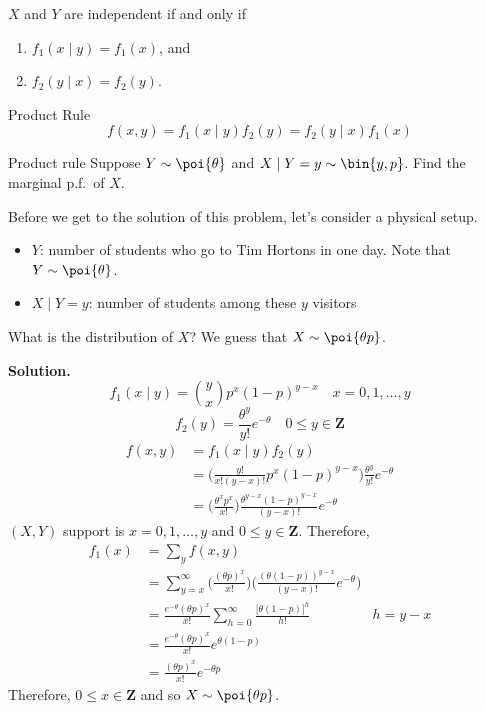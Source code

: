 \begin{Theorem}{}{}
    $ X $ and $ Y $ are independent if and only if
    \begin{enumerate}[label=(\arabic*)]
        \item $ f_1(x\mid y)=f_1(x) $, and
        \item $ f_2(y\mid x)=f_2(y) $.
    \end{enumerate}
\end{Theorem}
\begin{Theorem}{Product Rule}{}
    \[ f(x,y)=f_1(x\mid y)f_2(y)=f_2(y\mid x)f_1(x)  \]
\end{Theorem}
\begin{Example}{Product rule}{}
    Suppose $ Y \sim \poi{\theta} $ and $ X\mid Y=y \sim \bin{y,p} $.
    Find the marginal p.f.\ of $ X $.

    Before we get to the solution of this problem, let's consider a physical setup.
    \begin{itemize}
        \item $ Y $: number of students who go to Tim Hortons
              in one day. Note that $ Y \sim \poi{\theta} $.
        \item $ X\mid Y=y $: number of students among
              these $ y $ visitors
    \end{itemize}
    What is the distribution of $ X $? We guess that $ X \sim \poi{\theta p} $.

    \textbf{Solution.}
    \[ f_1(x\mid y)=\binom{y}{x}p^x (1-p)^{y-x}\quad x=0,1,\ldots,y \]
    \[ f_2(y)=\frac{\theta^y}{y!}e^{-\theta}\quad 0\le y\in\mathbf{Z}  \]
    \begin{align*}
        f(x,y)
         & =f_1(x\mid y)f_2(y)                                                                         \\
         & =\biggl( \frac{y!}{x!(y-x)!}p^x(1-p)^{y-x} \biggr)\frac{\theta^y}{y!} e^{-\theta}           \\
         & =\biggl( \frac{\theta^x p^x}{x!}  \biggr)\frac{\theta^{y-x}(1-p)^{y-x}}{(y-x)!} e^{-\theta}
    \end{align*}
    $ (X,Y) $ support is $ x=0,1,\ldots,y $ and $ 0\le y\in\mathbf{Z} $. Therefore,
    \begin{align*}
        f_1(x)
         & =\sum_{y}f(x,y)                                                                                        \\
         & =\sum_{y=x}^{\infty}
        \biggl( \frac{(\theta p)^x}{x!} \biggr)\biggl( \frac{(\theta(1-p))^{y-x}}{(y-x)!} e^{-\theta} \biggr)     \\
         & =\frac{e^{-\theta} (\theta p)^x}{x!} \sum_{h=0}^{\infty} \frac{\bigl[\theta(1-p) \bigr]^h}{h!} & h=y-x \\
         & =\frac{e^{-\theta} (\theta p)^x}{x!}e^{\theta(1-p)}                                                    \\
         & =\frac{(\theta p)^x}{x!}e^{-\theta p}
    \end{align*}
    Therefore, $ 0\le x\in\mathbf{Z} $ and so $ X \sim \poi{\theta p} $.
\end{Example}
